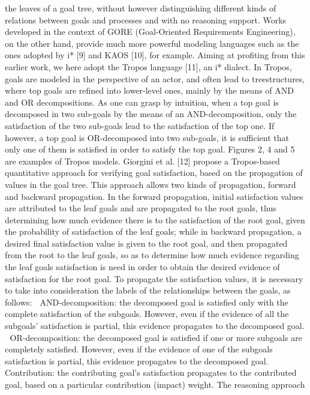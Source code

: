 the leaves of a goal tree, without however distinguishing different kinds of relations
between goals and processes and with no reasoning support. Works developed in the
context of GORE (Goal-Oriented Requirements Engineering), on the other hand, provide much more powerful modeling languages such as the ones adopted by i* [9] and
KAOS [10], for example. Aiming at profiting from this earlier work, we here adopt the
Tropos language [11], an i* dialect.
In Tropos, goals are modeled in the perspective of an actor, and often lead to treestructures, where top goals are refined into lower-level ones, mainly by the means of 
AND and OR decompositions. As one can grasp by intuition, when a top goal is decomposed in two sub-goals by the means of an AND-decomposition, only the satisfaction of the two sub-goals lead to the satisfaction of the top one. If however, a top goal
is OR-decomposed into two sub-goals, it is sufficient that only one of them is satisfied
in order to satisfy the top goal. Figures 2, 4 and 5 are examples of Tropos models.
Giorgini et al. [12] propose a Tropos-based quantitative approach for verifying goal
satisfaction, based on the propagation of values in the goal tree. This approach allows
two kinds of propagation, forward and backward propagation. In the forward propagation, initial satisfaction values are attributed to the leaf goals and are propagated to the
root goals, thus determining how much evidence there is to the satisfaction of the root
goal, given the probability of satisfaction of the leaf goals; while in backward propagation, a desired final satisfaction value is given to the root goal, and then propagated
from the root to the leaf goals, so as to determine how much evidence regarding the leaf
goals satisfaction is need in order to obtain the desired evidence of satisfaction for the
root goal.
To propagate the satisfaction values, it is necessary to take into consideration the
labels of the relationships between the goals, as follows:
 AND-decomposition: the decomposed goal is satisfied only with the complete satisfaction of the subgoals. However, even if the evidence of all the subgoals’ satisfaction is partial, this evidence propagates to the decomposed goal.
 OR-decomposition: the decomposed goal is satisfied if one or more subgoals are
completely satisfied. However, even if the evidence of one of the subgoals satisfaction is partial, this evidence propagates to the decomposed goal.
 Contribution: the contributing goal’s satisfaction propagates to the contributed
goal, based on a particular contribution (impact) weight. The reasoning approach
